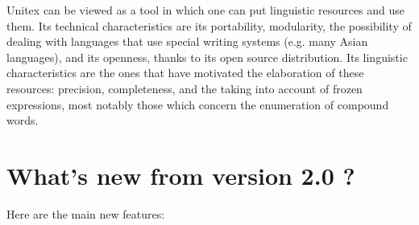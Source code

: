 \bigskip
\noindent Unitex can be viewed as a tool in which one can put linguistic resources
and use them. Its technical characteristics are its portability,  modularity,
the possibility of dealing with languages that use special writing systems (e.g. many
Asian languages), and its openness, thanks to its open source distribution. Its
linguistic characteristics are the ones that have motivated the elaboration of
these resources: precision, completeness, and the taking into account of frozen
expressions, most notably those which concern the enumeration of compound words.


\section*{What's new from version 2.0 ?}
Here are the main new features:
